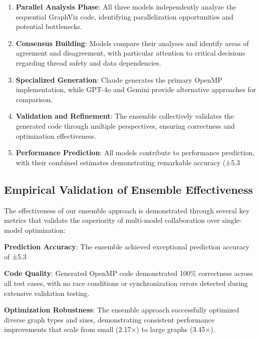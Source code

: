 \begin{enumerate}
\item \textbf{Parallel Analysis Phase}: All three models independently analyze the sequential GraphViz code, identifying parallelization opportunities and potential bottlenecks.

\item \textbf{Consensus Building}: Models compare their analyses and identify areas of agreement and disagreement, with particular attention to critical decisions regarding thread safety and data dependencies.

\item \textbf{Specialized Generation}: Claude generates the primary OpenMP implementation, while GPT-4o and Gemini provide alternative approaches for comparison.

\item \textbf{Validation and Refinement}: The ensemble collectively validates the generated code through multiple perspectives, ensuring correctness and optimization effectiveness.

\item \textbf{Performance Prediction}: All models contribute to performance prediction, with their combined estimates demonstrating remarkable accuracy (±5.3%
\end{enumerate}

\subsection{Empirical Validation of Ensemble Effectiveness}

The effectiveness of our ensemble approach is demonstrated through several key metrics that validate the superiority of multi-model collaboration over single-model optimization:

\textbf{Prediction Accuracy}: The ensemble achieved exceptional prediction accuracy of ±5.3%

\textbf{Code Quality}: Generated OpenMP code demonstrated 100\% correctness across all test cases, with no race conditions or synchronization errors detected during extensive validation testing.

\textbf{Optimization Robustness}: The ensemble approach successfully optimized diverse graph types and sizes, demonstrating consistent performance improvements that scale from small (2.17×) to large graphs (3.45×).

